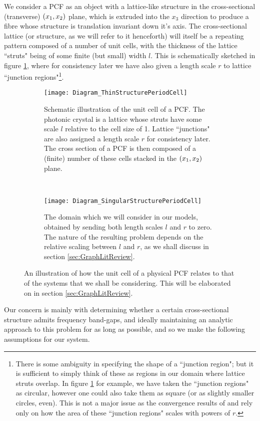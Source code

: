 We consider a PCF as an object with a lattice-like structure in the cross-sectional (transverse) $\left( x_1,x_2 \right)$ plane, which is extruded into the $x_3$ direction to produce a fibre whose structure is translation invariant down it's axis.
The cross-sectional lattice (or structure, as we will refer to it henceforth) will itself be a repeating pattern composed of a number of unit cells, with the thickness of the lattice ``struts" being of some finite (but small) width $l$.
This is schematically sketched in figure \ref{fig:Diagram_ThinStructurePeriodCell}, where for consistency later we have also given a length scale $r$ to lattice ``junction regions"\footnote{There is some ambiguity in specifying the shape of a ``junction region"; but it is sufficient to simply think of these as regions in our domain where lattice struts overlap.
In figure \ref{fig:Diagram_ThinStructurePeriodCell} for example, we have taken the ``junction regions" as circular, however one could also take them as square (or as slightly smaller circles, even).
This is not a major issue as the convergence results of \cite{exner2005convergence} and  rely only on how the area of these ``junction regions" scales with powers of $r$.}.
\begin{figure}[b!]
	\centering
	\begin{subfigure}[t]{0.45\textwidth}
		\centering
		\texttt{[image: Diagram\_ThinStructurePeriodCell]}
		\caption{\label{fig:Diagram_ThinStructurePeriodCell} Schematic illustration of the unit cell of a PCF. The photonic crystal is a lattice whose struts have some scale $l$ relative to the cell size of 1. Lattice ``junctions" are also assigned a length scale $r$ for consistency later. The cross section of a PCF is then composed of a (finite) number of these cells stacked in the $\left( x_1,x_2 \right)$ plane.}
	\end{subfigure}
	~
	\begin{subfigure}[t]{0.45\textwidth}
		\centering
		\texttt{[image: Diagram\_SingularStructurePeriodCell]}
		\caption{\label{fig:Diagram_SingularStructurePeriodCell} The domain which we will consider in our models, obtained by sending both length scales $l$ and $r$ to zero. The nature of the resulting problem depends on the relative scaling between $l$ and $r$, as we shall discuss in section \ref{sec:GraphLitReview}.}
	\end{subfigure}
	\caption{\label{fig:ThinToSingularStructure} An illustration of how the unit cell of a physical PCF relates to that of the systems that we shall be considering. This will be elaborated on in section \ref{sec:GraphLitReview}.}
\end{figure}
Our concern is mainly with determining whether a certain cross-sectional structure admits frequency band-gaps, and ideally maintaining an analytic approach to this problem for as long as possible, and so we make the following assumptions for our system.

